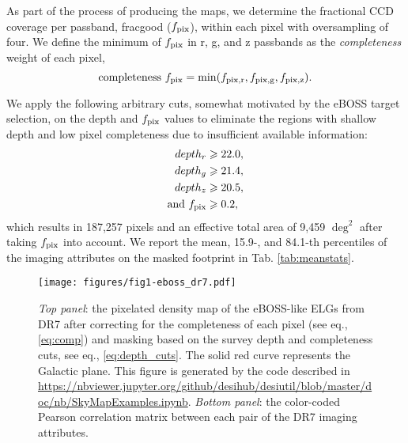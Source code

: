 As part of the process of producing the maps, we determine the fractional CCD coverage per passband, fracgood ($f_{{\rm pix}}$), within each pixel with oversampling of four. We define the minimum of $f_{{\rm pix}}$ in r, g, and z passbands as the \textit{completeness} weight of each pixel,
\begin{equation}
    \label{eq:comp}
    \text{completeness}~f_{\rm pix} = \min(f_{\rm pix,r}, f_{\rm pix,g}, f_{\rm pix,z}).
\end{equation}


We apply the following arbitrary cuts, somewhat motivated by the eBOSS target selection, on the depth and $f_{{\rm pix}}$ values to eliminate the regions with shallow depth and low pixel completeness due to insufficient available information: \\
\begin{align}\label{eq:depth_cuts}
depth_{r} &\geq 22.0, \\
depth_{g} &\geq 21.4, \nonumber\\
depth_{z} &\geq 20.5, \nonumber\\
{\rm and}~f_{\rm pix}  &\geq 0.2, \nonumber
\end{align}
which results in 187,257 pixels and an effective total area of 9,459 $\deg^2$ after taking $f_{{\rm pix}}$ into account. We report the mean, 15.9-, and 84.1-th percentiles of the imaging attributes on the masked footprint in Tab. \ref{tab:meanstats}.\\


\begin{figure*}
    \centering
    \texttt{[image: figures/fig1-eboss\_dr7.pdf]}
    \caption{\textit{Top panel}: the pixelated density map of the eBOSS-like ELGs from DR7 after correcting for the completeness of each pixel (see eq., \ref{eq:comp}) and masking based on the survey depth and completeness cuts, see eq.,  \ref{eq:depth_cuts}. The solid red curve represents the Galactic plane. This figure is generated by the code described in \url{https://nbviewer.jupyter.org/github/desihub/desiutil/blob/master/doc/nb/SkyMapExamples.ipynb}. \textit{Bottom panel}: the color-coded Pearson correlation matrix between each pair of the DR7 imaging attributes.}
    \label{fig:eboss_dr7}
\end{figure*} 


